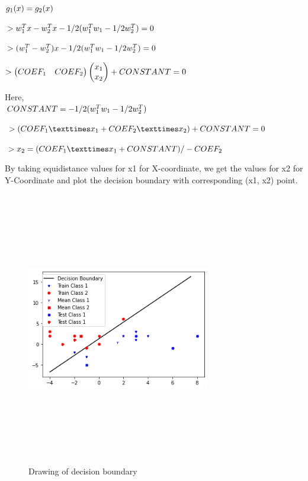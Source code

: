 \documentclass[conference]{IEEEtran}
\begin{document}
\begin{itemize}
	$g_1 (x)=g_2 (x)\\$

$
>w_1^T x-w_2^T x-1/2 (w_1^T w_1-1/2 w_2^T)=0\\$


$
>(w_1^T-w_2^T)x-1/2 (w_1^T w_1-1/2 w_2^T)=0\\$


$
>\begin{pmatrix}COEF_1  & COEF_2\end{pmatrix}
\begin{pmatrix} x_1\\x_2 \end{pmatrix}+CONSTANT=0\\$

Here,\\

$
CONSTANT=-1/2 (w_1^T w_1-1/2 w_2^T)\\$


$
>
(COEF_1×x_1+COEF_2×x_2 )+CONSTANT=0\\$

$
>x_2=(COEF_1×x_1+CONSTANT)/-COEF_2 \\$

By taking equidistance values for x1 for X-coordinate, we get the values for x2 for Y-Coordinate and plot the decision boundary with corresponding (x1, x2) point.\\

\begin{figure}[htbp]
\centerline{\includegraphics[width=8cm, height=12cm]{fr.png}}
\caption{Drawing of decision boundary}
\label{fig}
\end{figure}
\end{itemize}
\end{document}
